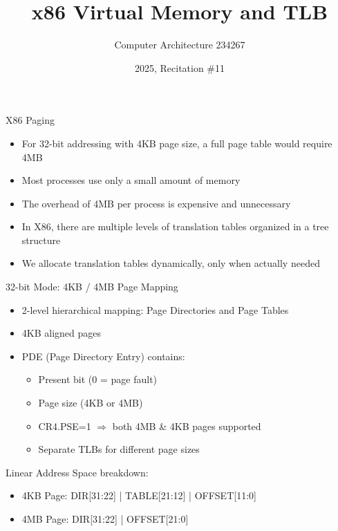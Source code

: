 \documentclass[aspectratio=169,12pt]{beamer}
\title{x86 Virtual Memory and TLB}
\author{Computer Architecture 234267}
\date{2025, Recitation \#11}
\begin{document}
\begin{frame}
\titlepage
\end{frame}

\begin{frame}{X86 Paging}
\begin{itemize}
    \item For 32-bit addressing with 4KB page size, a full page table would require 4MB
    \item Most processes use only a small amount of memory
    \item The overhead of 4MB per process is expensive and unnecessary
    \item In X86, there are multiple levels of translation tables organized in a tree structure
    \item We allocate translation tables dynamically, only when actually needed
\end{itemize}
\end{frame}

\begin{frame}{32-bit Mode: 4KB / 4MB Page Mapping}
\begin{itemize}
    \item 2-level hierarchical mapping: Page Directories and Page Tables
    \item 4KB aligned pages
    \item PDE (Page Directory Entry) contains:
    \begin{itemize}
        \item Present bit (0 = page fault)
        \item Page size (4KB or 4MB)
        \item CR4.PSE=1 $\Rightarrow$ both 4MB \& 4KB pages supported
        \item Separate TLBs for different page sizes
    \end{itemize}
\end{itemize}

\vspace{1em}
Linear Address Space breakdown:
\begin{itemize}
    \item 4KB Page: DIR[31:22] | TABLE[21:12] | OFFSET[11:0]
    \item 4MB Page: DIR[31:22] | OFFSET[21:0]
\end{itemize}
\end{frame}
\end{document}
